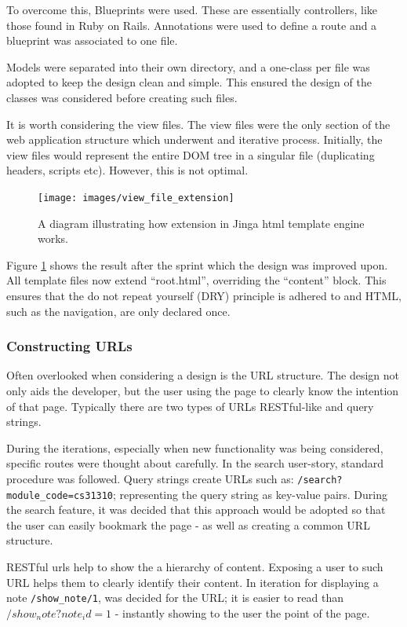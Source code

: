 To overcome this, Blueprints were used. These are essentially controllers, like those found in Ruby on Rails. Annotations were used to define a route and a blueprint was associated to one file.

Models were separated into their own directory, and a one-class per file was adopted to keep the design clean and simple. This ensured the design of the classes was considered before creating such files.

It is worth considering the view files. The view files were the only section of the web application structure which underwent and iterative process. Initially, the view files would represent the entire DOM tree in a singular file (duplicating headers, scripts etc). However, this is not optimal.

\begin{figure}[h]
  \centering
  \texttt{[image: images/view\_file\_extension]}
  \caption{A diagram illustrating how extension in Jinga html template engine works.}
  \label{fig:extension}
\end{figure}

Figure \ref{fig:extension} shows the result after the sprint which the design was improved upon. All template files now extend ``root.html'', overriding the ``content'' block. This ensures that the do not repeat yourself (DRY) principle is adhered to and HTML, such as the navigation, are only declared once.

\subsubsection{Constructing URLs}
Often overlooked when considering a design is the URL structure. The design not only aids the developer, but the user using the page to clearly know the intention of that page. Typically there are two types of URLs RESTful-like and query strings.

During the iterations, especially when new functionality was being considered, specific routes were thought about carefully. In the search user-story, standard procedure was followed. Query strings create URLs such as: \texttt{/search?module_code=cs31310}; representing the query string as key-value pairs. During the search feature, it was decided that this approach would be adopted so that the user can easily bookmark the page - as well as creating a common URL structure.

RESTful urls help to show the a hierarchy of content. Exposing a user to such URL helps them to clearly identify their content. In iteration for displaying a note \texttt{/show_note/1}, was decided for the URL; it is easier to read than  \texttt{$/show_note?note_id=1$} - instantly showing to the user the point of the page.

